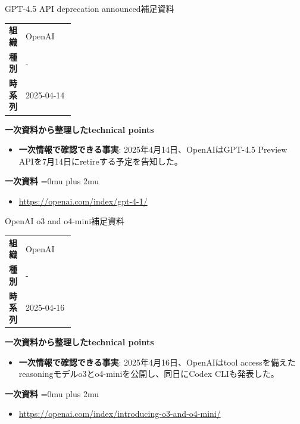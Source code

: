 \begin{technicalnote}{GPT-4.5 API deprecation announced}{補足資料}
\begingroup
\begin{tabularx}{\linewidth}{@{}>{\bfseries}p{0.22\linewidth}X@{}}
組織 & OpenAI \\
種別 & - \\
時系列 & 2025-04-14 \\
\end{tabularx}
\smallskip
{\bfseries 一次資料から整理したtechnical points}
\begin{itemize}[leftmargin=1.5em,itemsep=0.35em]
\item \textbf{一次情報で確認できる事実}: 2025年4月14日、OpenAIはGPT-4.5 Preview APIを7月14日にretireする予定を告知した。
\end{itemize}
\begin{samepage}
{\bfseries 一次資料}
\begingroup\sloppy
\Urlmuskip=0mu plus 2mu\relax
\begin{itemize}[leftmargin=1.5em,itemsep=0.25em]
\item {\scriptsize\url{https://openai.com/index/gpt-4-1/}}
\end{itemize}
\endgroup
\end{samepage}
\endgroup
\end{technicalnote}
\medskip

\begin{technicalnote}{OpenAI o3 and o4-mini}{補足資料}
\begingroup
\begin{tabularx}{\linewidth}{@{}>{\bfseries}p{0.22\linewidth}X@{}}
組織 & OpenAI \\
種別 & - \\
時系列 & 2025-04-16 \\
\end{tabularx}
\smallskip
{\bfseries 一次資料から整理したtechnical points}
\begin{itemize}[leftmargin=1.5em,itemsep=0.35em]
\item \textbf{一次情報で確認できる事実}: 2025年4月16日、OpenAIはtool accessを備えたreasoningモデルo3とo4-miniを公開し、同日にCodex CLIも発表した。
\end{itemize}
\begin{samepage}
{\bfseries 一次資料}
\begingroup\sloppy
\Urlmuskip=0mu plus 2mu\relax
\begin{itemize}[leftmargin=1.5em,itemsep=0.25em]
\item {\scriptsize\url{https://openai.com/index/introducing-o3-and-o4-mini/}}
\end{itemize}
\endgroup
\end{samepage}
\endgroup
\end{technicalnote}
\medskip

